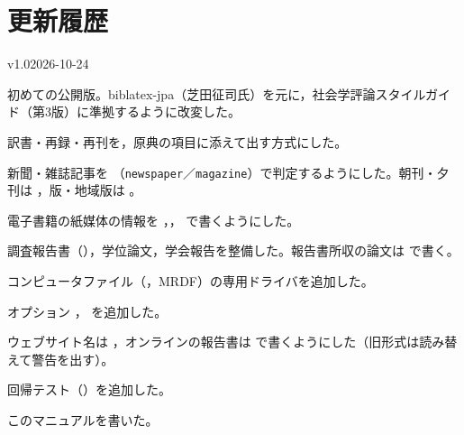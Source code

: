 \appendix
\section{更新履歴}\label{sec:changelog}
\begin{changelog}
\begin{release}{v1.0}{2026-10-24}
\item 初めての公開版。biblatex-jpa（芝田征司氏）を元に，社会学評論スタイルガイド（第3版）に準拠するように改変した。
\item 訳書・再録・再刊を，原典の項目に添えて出す方式にした。
\item 新聞・雑誌記事を （\texttt{newspaper}／\texttt{magazine}）で判定するようにした。朝刊・夕刊は ，版・地域版は 。
\item 電子書籍の紙媒体の情報を ，， で書くようにした。
\item 調査報告書（），学位論文，学会報告を整備した。報告書所収の論文は  で書く。
\item コンピュータファイル（，MRDF）の専用ドライバを追加した。
\item オプション ， を追加した。
\item ウェブサイト名は ，オンラインの報告書は  で書くようにした（旧形式は読み替えて警告を出す）。
\item 回帰テスト（）を追加した。
\item このマニュアルを書いた。
\end{release}
\end{changelog}
